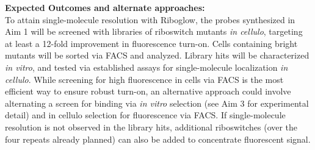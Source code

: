 \textbf{Expected Outcomes and alternate approaches:}\\
To attain single-molecule resolution with Riboglow, the probes synthesized in Aim 1 will be screened with libraries of riboswitch mutants \textit{in cellulo}, targeting at least a 12-fold improvement in fluorescence turn-on. Cells containing bright mutants will be sorted via FACS and analyzed. Library hits will be characterized \textit{in vitro}, and tested via established assays for single-molecule localization \textit{in cellulo}.
While screening for high fluorescence in cells via FACS is the most efficient way to ensure robust turn-on, an alternative approach could involve alternating a screen for binding via \textit{in vitro} selection (see Aim 3 for experimental detail) and in cellulo selection for fluorescence via FACS.
If single-molecule resolution is not observed in the library hits, additional riboswitches (over the four repeats already planned) can also be added to concentrate fluorescent signal.


